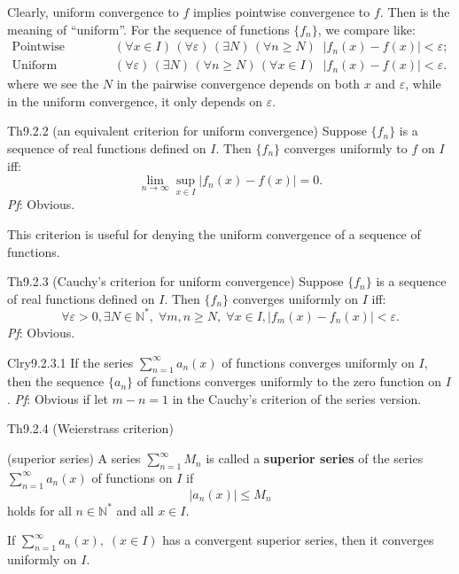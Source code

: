 \documentclass{article}
\begin{document}
\begin{Rmk}{}
    \textcolor{Th}{Clearly, uniform convergence to $f$ implies pointwise convergence to $f$.} Then is the meaning of ``uniform''. For the sequence of functions $\{f_n\}$, we compare like:
    $$
    \begin{aligned}
        \text{Pointwise convergence:} & \quad (\forall x\in I) \,(\forall \varepsilon) \,(\exists N) \,(\forall n\geq N) \;\;|f_n(x) - f(x)| < \varepsilon; \\
        \text{Uniform convergence:} & \quad (\forall \varepsilon) \,(\exists N) \,(\forall n\geq N) \,(\forall x\in I) \;\;|f_n(x) - f(x)| < \varepsilon.
    \end{aligned}
    $$
    where we see the $N$ in the pairwise convergence depends on both $x$ and $\varepsilon$, while in the uniform convergence, it only depends on $\varepsilon$.
\end{Rmk}

\begin{Th}{Th9.2.2 (an equivalent criterion for uniform convergence)}
    Suppose $\{f_n\}$ is a sequence of real functions defined on $I$. Then $\{f_n\}$ converges uniformly to $f$ on $I$ iff:
    $$ \lim\limits_{n\to\infty} \sup_{x\in I} |f_n(x) - f(x)| = 0. $$
    \tcblower
    \textit{Pf}: Obvious.
\end{Th}

\begin{Rmk}{}
    This criterion is useful for denying the uniform convergence of a sequence of functions.
\end{Rmk}

\begin{Th}{Th9.2.3 (Cauchy's criterion for uniform convergence)}
    Suppose $\{f_n\}$ is a sequence of real functions defined on $I$. Then $\{f_n\}$ converges uniformly on $I$ iff:
    $$ \forall \varepsilon > 0, \exists N\in\mathbb{N}^\ast,\; \forall m,n \geq N,\; \forall x\in I, |f_m(x) - f_n(x)| < \varepsilon. $$
    \tcblower
    \textit{Pf}: Obvious.
\end{Th}

\begin{Th}{Clry9.2.3.1}
    If the series $\sum_{n=1}^{\infty} a_n(x)$ of functions converges uniformly on $I$, then the sequence $\{a_n\}$ of functions converges uniformly to the zero function on $I$.
    \tcblower
    \textit{Pf}: Obvious if let $m-n = 1$ in the Cauchy's criterion of the series version.
\end{Th}

\begin{Th}{Th9.2.4 (Weierstrass criterion)}
    \begin{compactenum}
        \item (superior series) A series $\sum_{n=1}^{\infty} M_n$ is called a \textbf{superior series} of the series $\sum_{n=1}^{\infty} a_n(x)$ of functions on $I$ if
        $$ |a_n(x)| \leq M_n $$
        holds for all $n\in\mathbb{N}^\ast$ and all $x\in I$.
        \item If $\sum_{n=1}^{\infty} a_n(x),\; (x\in I)$ has a convergent superior series, then it converges uniformly on $I$. 
    \end{compactenum}
\end{Th}
\end{document}
